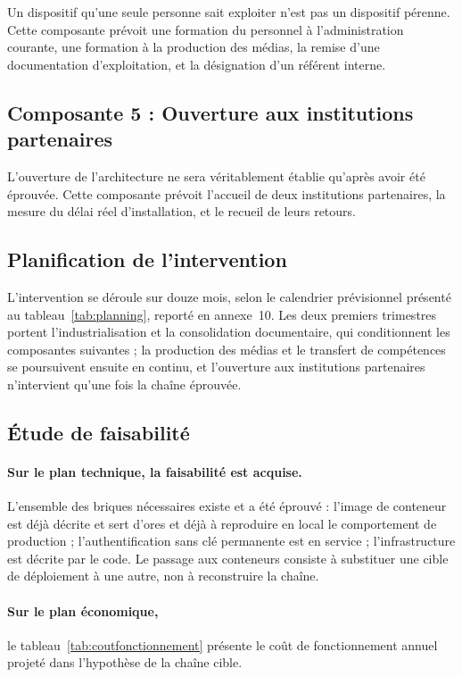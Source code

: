 Un dispositif qu'une seule personne sait exploiter n'est pas un dispositif
pérenne. Cette composante prévoit une formation du personnel à l'administration
courante, une formation à la production des médias, la remise d'une
documentation d'exploitation, et la désignation d'un référent interne.

\subsection{Composante 5 : Ouverture aux institutions partenaires}

L'ouverture de l'architecture ne sera véritablement établie qu'après avoir été
éprouvée. Cette composante prévoit l'accueil de deux institutions partenaires,
la mesure du délai réel d'installation, et le recueil de leurs retours.

\subsection{Planification de l'intervention}

L'intervention se déroule sur douze mois, selon le calendrier prévisionnel
présenté au tableau~\ref{tab:planning}, reporté en annexe~10. Les deux
premiers trimestres portent l'industrialisation et la consolidation
documentaire, qui conditionnent les composantes suivantes ; la production des
médias et le transfert de compétences se poursuivent ensuite en continu, et
l'ouverture aux institutions partenaires n'intervient qu'une fois la chaîne
éprouvée.

\subsection{Étude de faisabilité}

\paragraph{Sur le plan technique, la faisabilité est acquise.} L'ensemble des briques nécessaires existe et a été éprouvé :
l'image de conteneur est déjà décrite et sert d'ores et déjà à reproduire en
local le comportement de production ; l'authentification sans clé permanente est
en service ; l'infrastructure est décrite par le code. Le passage aux conteneurs
consiste à substituer une cible de déploiement à une autre, non à reconstruire
la chaîne.

\paragraph{Sur le plan économique,} le tableau~\ref{tab:coutfonctionnement}
présente le coût de fonctionnement annuel projeté dans l'hypothèse de la chaîne
cible.

